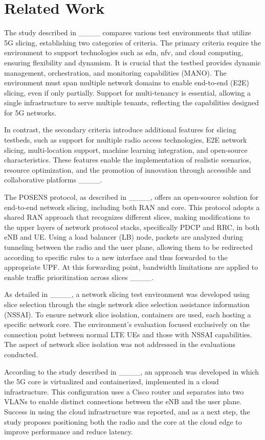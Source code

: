 \section{Related Work}
The study described in ____ compares various test environments that utilize 5G slicing, establishing two categories of criteria. The primary criteria require the environment to support technologies such as \gls{sdn}, \gls{nfv}, and cloud computing, ensuring flexibility and dynamism. It is crucial that the testbed provides dynamic management, orchestration, and monitoring capabilities (MANO). The environment must span multiple network domains to enable end-to-end (E2E) slicing, even if only partially. Support for multi-tenancy is essential, allowing a single infrastructure to serve multiple tenants, reflecting the capabilities designed for 5G networks.

In contrast, the secondary criteria introduce additional features for slicing testbeds, such as support for multiple radio access technologies, E2E network slicing, multi-location support, machine learning integration, and open-source characteristics. These features enable the implementation of realistic scenarios, resource optimization, and the promotion of innovation through accessible and collaborative platforms ____.

The POSENS protocol, as described in ____, offers an open-source solution for end-to-end network slicing, including both RAN and core. This protocol adopts a shared RAN approach that recognizes different slices, making modifications to the upper layers of network protocol stacks, specifically PDCP and RRC, in both eNB and UE. Using a load balancer (LB) node, packets are analyzed during tunneling between the radio and the user plane, allowing them to be redirected according to specific rules to a new interface and thus forwarded to the appropriate UPF. At this forwarding point, bandwidth limitations are applied to enable traffic prioritization across slices ____.

As detailed in ____, a network slicing test environment was developed using slice selection through the single network slice selection assistance information (NSSAI). To ensure network slice isolation, containers are used, each hosting a specific network core. The environment's evaluation focused exclusively on the connection point between normal LTE UEs and those with NSSAI capabilities. The aspect of network slice isolation was not addressed in the evaluations conducted.

According to the study described in ____, an approach was developed in which the 5G core is virtualized and containerized, implemented in a cloud infrastructure. This configuration uses a Cisco router and separates into two VLANs to enable distinct connections between the eNB and the user plane. Success in using the cloud infrastructure was reported, and as a next step, the study proposes positioning both the radio and the core at the cloud edge to improve performance and reduce latency.

